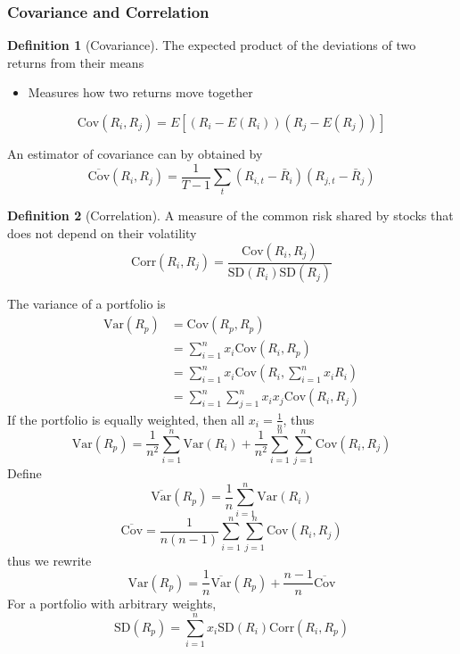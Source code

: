 \documentclass[11pt]{article}
\theoremstyle{definition}
\newtheorem*{definition}{Definition}
\newcommand{\Var}{\text{Var}}
\newcommand{\Cov}{\text{Cov}}
\newcommand{\Sd}{\text{SD}}
\newcommand{\Corr}{\text{Corr}}
\begin{document}
\subsubsection{Covariance and Correlation}
\begin{definition}[Covariance]
    The expected product of the deviations of two returns from their means
    \begin{itemize}
        \item Measures how two returns move together
    \end{itemize}
    \begin{equation*}
        \Cov(R_i, R_j) = E[(R_i - E(R_i))(R_j - E(R_j))]
    \end{equation*}
\end{definition}
An estimator of covariance can by obtained by 
\begin{equation*}
    \overline{\Cov}(R_i, R_j) = \frac{1}{T-1}\sum_{t} (R_{i, t} - \bar R_i)(R_{j, t} - \bar R_j)
\end{equation*}
\begin{definition}[Correlation]
    A measure of the common risk shared by stocks that does not depend on their volatility
    \begin{equation*}
        \Corr(R_i, R_j) = \frac{\Cov(R_i, R_j)}{\Sd(R_i)\Sd(R_j)}
    \end{equation*}
\end{definition}
The variance of a portfolio is 
\begin{align*}
    \Var(R_p)  &= \Cov(R_p, R_p)\\
    &= \sum_{i=1}^n x_i \Cov(R_i, R_p)\\
    &= \sum_{i=1}^n x_i\Cov\left(R_i, \sum_{i=1}^n x_i R_i\right)\\
    &= \sum_{i=1}^n \sum_{j=1}^n x_ix_j \Cov(R_i, R_j)
\end{align*}
If the portfolio is equally weighted, then all $x_i = \frac{1}{n}$, thus 
\begin{equation*}
    \Var(R_p) = \frac{1}{n^2}\sum_{i=1}^n \Var(R_i) + \frac{1}{n^2}\sum_{i=1}^n\sum_{j=1}^n \Cov(R_i, R_j)
\end{equation*}
Define 
\begin{equation*}
    \overline{\Var}(R_p) = \frac{1}{n}\sum_{i=1}^n \Var(R_i)
\end{equation*}
\begin{equation*}
    \overline{\Cov} = \frac{1}{n(n-1)}\sum_{i=1}^n\sum_{j=1}^n \Cov(R_i, R_j)
\end{equation*}
thus we rewrite 
\begin{equation*}
    \Var(R_p) = \frac{1}{n}\overline{\Var}(R_p) + \frac{n-1}{n}\overline{\Cov}
\end{equation*}
For a portfolio with arbitrary weights,
\begin{equation*}
    \Sd(R_p) = \sum_{i=1}^n x_i \Sd(R_i)\Corr(R_i, R_p)
\end{equation*}
\end{document}
